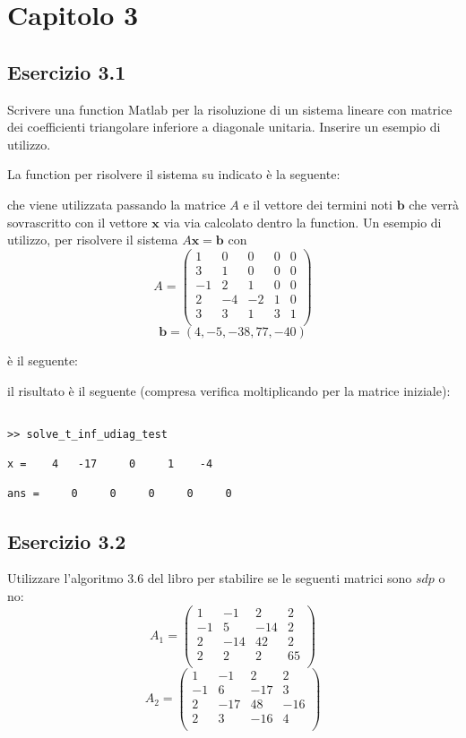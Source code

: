 \section{Capitolo 3}


	\subsection{Esercizio 3.1}

Scrivere una function Matlab per la risoluzione di un sistema lineare con matrice dei coefficienti triangolare inferiore a diagonale unitaria. Inserire un esempio di utilizzo.

La function per risolvere il sistema su indicato è la seguente:



che viene utilizzata passando la matrice $A$ e il vettore dei termini noti $\mathbf{b}$ che verrà sovrascritto con il vettore $\mathbf{x}$ via via calcolato dentro la function. 
Un esempio di utilizzo, per risolvere il sistema $A\mathbf{x}=\mathbf{b}$ con
	\[	
		A = 
		\begin{pmatrix}
			1&0&0&0&0 \\
			3&1&0&0&0\\
			-1&2&1&0&0\\
			2&-4&-2&1&0\\
			3&3&1&3&1\\
		\end{pmatrix}
	\]
	\[  
		\mathbf{b}=(4,-5,-38,77,-40)
	\]
	
 è il seguente:
 


il risultato è il seguente (compresa verifica moltiplicando per la matrice iniziale):

\begin{lstlisting}[frame=single]

>> solve_t_inf_udiag_test

x =    4   -17     0     1    -4

ans =     0     0     0     0     0

\end{lstlisting}

	\subsection{Esercizio 3.2}

Utilizzare l'algoritmo 3.6 del libro per stabilire se le seguenti matrici sono $sdp$ o no:
	\[	
		A_1 = 
		\begin{pmatrix}
			1&-1&2&2 \\
			-1&5&-14&2\\
			2&-14&42&2\\
			2&2&2&65\\
		\end{pmatrix}
	\]
	\[		
		A_2 =
		\begin{pmatrix}
			1&-1&2&2\\
			-1&6&-17&3\\
			2&-17&48&-16\\
			2&3&-16&4\\
		\end{pmatrix}
	\]

